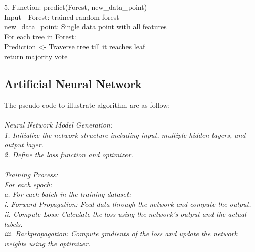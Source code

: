 \documentclass[10pt]{article}
\begin{document}
{5. Function: predict(Forest, new\_data\_point)\\
\hspace*{3em} Input - Forest: trained random forest\\
\hspace*{3em} new\_data\_point: Single data point with all features\\
\hspace*{3em} For each tree in Forest:\\
\hspace*{5em} Prediction <- Traverse tree till it reaches leaf\\
\hspace*{3em} return majority vote\\
}
\pagebreak
\subsection{{Artificial Neural Network}}
The pseudo-code to illustrate algorithm are as follow:\\\\
\textit{Neural Network Model Generation:\\
1. Initialize the network structure including input, multiple hidden layers, and output layer.\\
2. Define the loss function and optimizer.\\\\
Training Process:\\
For each epoch:\\
   a. For each batch in the training dataset:\\
      i. Forward Propagation: Feed data through the network and compute the output.\\
      ii. Compute Loss: Calculate the loss using the network's output and the actual labels.\\
      iii. Backpropagation: Compute gradients of the loss and update the network weights using the optimizer.\\}



\pagebreak
\end{document}

